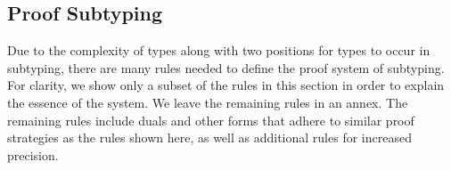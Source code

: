 \documentclass[acmsmall]{acmart}
\theoremstyle{definition}
\begin{document}
\subsection{Proof Subtyping}

Due to the complexity of types along with two positions for types to occur in subtyping,
there are many rules needed to define the proof system of subtyping. For clarity,
we show only a subset of the rules in this section in order to explain the essence of the system.
We leave the remaining rules in an annex. 
The remaining rules include duals and other forms that adhere to similar proof strategies as the rules shown here,
as well as additional rules for increased precision.  




\end{document}

